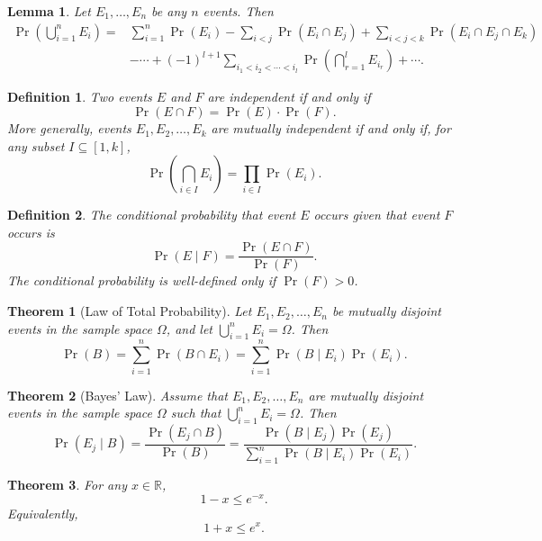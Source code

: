 \documentclass{amsart}
\newtheorem*{definition}{Definition}
\newtheorem*{theorem}{Theorem}
\newtheorem*{lemma}{Lemma}
\newcommand{\R}{\mathbb{R}}
\begin{document}
\begin{lemma}
  Let $E_1, \ldots, E_n$ be any $n$ events. Then
  \begin{align*}
    \Pr \left( \bigcup_{i = 1}^n E_i \right) = & \sum_{i = 1}^n \Pr(E_i) - \sum_{i
    < j} \Pr(E_i \cap E_j) + \sum_{i < j < k} \Pr(E_i \cap E_j \cap E_k) \\
    &- \cdots + {(-1)}^{l + 1} \sum_{i_1 < i_2 < \cdots < i_l} \Pr \left(
    \bigcap_{r = 1}^l E_{i_r} \right) + \cdots.
  \end{align*}
\end{lemma}

\begin{definition}
  Two events $E$ and $F$ are independent if and only if
  \[
    \Pr(E \cap F) = \Pr(E) \cdot \Pr(F).
  \]
  More generally, events $E_1, E_2, \ldots, E_k$ are mutually independent if and
  only if, for any subset $I \subseteq [1, k]$,
  \[
    \Pr \left( \bigcap_{i \in I} E_i \right) = \prod_{i \in I} \Pr(E_i).
  \]
\end{definition}

\begin{definition}
  The conditional probability that event $E$ occurs given that event $F$ occurs
  is
  \[
    \Pr(E \mid F) = \frac{\Pr(E \cap F)}{\Pr(F)}.
  \]
  The conditional probability is well-defined only if $\Pr(F) > 0$.
\end{definition}

\begin{theorem}[Law of Total Probability]
  Let $E_1, E_2, \ldots, E_n$ be mutually disjoint events in the sample space
  $\Omega$, and let $\bigcup_{i = 1}^n E_i = \Omega$. Then
  \[
    \Pr(B) = \sum_{i = 1}^n \Pr(B \cap E_i) = \sum_{i = 1}^n \Pr(B \mid E_i)
    \Pr(E_i).
  \]
\end{theorem}

\begin{theorem}[Bayes' Law]
  Assume that $E_1, E_2, \ldots, E_n$ are mutually disjoint events in the sample
  space $\Omega$ such that $\bigcup_{i = 1}^n E_i = \Omega$. Then
  \[
    \Pr(E_j \mid B) = \frac{\Pr(E_j \cap B)}{\Pr(B)} = \frac{\Pr(B \mid E_j)
    \Pr(E_j)}{\sum_{i = 1}^n \Pr(B \mid E_i) \Pr(E_i)}.
  \]
\end{theorem}

\begin{theorem}
  For any $x \in \R$,
  \[
    1 - x \leq e^{-x}.
  \]
  Equivalently,
  \[
    1 + x \leq e^x.
  \]
\end{theorem}

\end{document}
